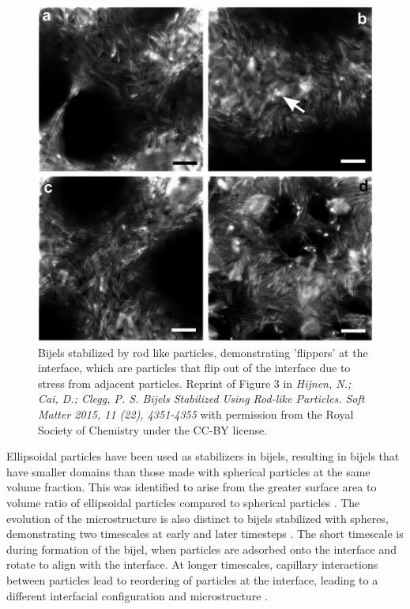 \begin{figure}
    \centering
    \includegraphics[scale = 0.25]{../figures/literature_review/rods_bijels.png}
    \caption{Bijels stabilized by rod like particles, demonstrating 'flippers' at the interface, which are particles that flip out of the interface due to stress from adjacent particles. 
             Reprint of Figure 3 in 
             \textit{Hijnen, N.; Cai, D.; Clegg, P. S. Bijels Stabilized Using Rod-like Particles. Soft Matter 2015, 11 (22), 4351-4355} 
             with permission from the Royal Society of Chemistry under the CC-BY license.}
    \label{fig:rod_bijel_flippers}
\end{figure}

Ellipsoidal particles have been used as stabilizers in bijels, resulting in bijels that have smaller domains than those made with spherical particles at the same volume fraction. This was identified 
to arise from the greater surface area to volume ratio of ellipsoidal particles compared to spherical particles \cite{gunther_timescales_2014}. The evolution of the microstructure is also distinct 
to bijels stabilized with spheres, demonstrating two timescales at early and later timesteps \cite{gunther_timescales_2014}. The short timescale is during formation of the bijel, when particles 
are adsorbed onto the interface and rotate to align with the interface. At longer timescales, capillary interactions between particles lead to reordering of particles at the interface, leading 
to a different interfacial configuration and microstructure \cite{gunther_timescales_2014}. 

